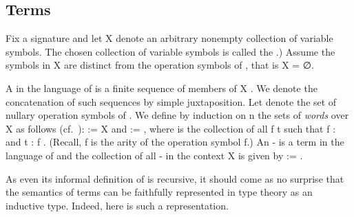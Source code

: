 
\subsection{Terms}
\label{terms}
Fix a signature  and let \ab X denote an arbitrary nonempty collection of variable
symbols. The chosen collection of variable symbols is called the .)
Assume the symbols in \ab X are distinct from the operation symbols of
, that is \ab X     = ∅.

A  in the language of  is a finite sequence of members of \ab X 
. We denote the concatenation of such sequences by simple juxtaposition.
Let  denote the set of nullary operation symbols of . We define by induction
on \ab n the sets  of \emph{words} over \ab X   as
follows (cf.~\cite[Def. 4.19]{Bergman:2012}):  := \ab X   and
 :=   , where  is the collection of all \ab f \ab t
such that \ab f :  and \ab t :  \ab f 
. (Recall,  \ab f is the arity of the operation symbol \ab
f.) An - is a term in the language of  and the collection of all
- in the context \ab X is given by  :=  .

As even its informal definition of  is recursive, it should come as no surprise
that the semantics of terms can be faithfully represented in type theory as an inductive
type. Indeed, here is such a representation.

